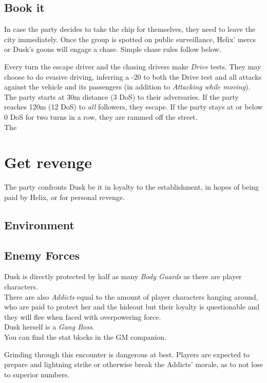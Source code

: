 \subsection{Book it}
\label{sec:flee}
In case the party decides to take the chip for themselves,
	they need to leave the city immediately.
Once the group is spotted on public surveillance,
	Helix' mercs or Dusk's goons
	will engage a chase.
Simple chase rules follow below.
\par
Every turn
	the escape driver and the chasing drivers
	make \emph{Drive} tests.
They may choose to do evasive driving,
	inferring a -20 to both the Drive test
	and all attacks against the vehicle and its passengers
	(in addition to \emph{Attacking while moving}).
\\%
The party starts at 30m distance (3 DoS) to their adversaries.
If the party reaches 120m (12 DoS) to \emph{all} followers,
	they escape.
If the party stays at or below 0 DoS for two turns in a row,
	they are rammed off the street.
\\%
The 

\section{Get revenge}
\label{sec:revenge}
The party confronts Dusk 
	be it
	in loyalty to the establishment,
	in hopes of being paid by Helix,
	or for personal revenge.
\subsection*{Environment}

\subsection*{Enemy Forces}
Dusk is directly protected by 
	half as many 
	\emph{Body Guards}
	as there are player characters.
	\\%
There are also
	\emph{Addicts}
	equal to the amount of player characters
	hanging around, who are paid to protect her and the hideout
	but their loyalty is questionable and they will flee when faced with overpowering force.
	\\%
Dusk herself is a \emph{Gang Boss}.
\\%
You can find the stat blocks in the GM companion.
\begin{exampleblock}
	Grinding through this encounter is dangerous at best.
	Players are expected to prepare
		and lightning strike
		or otherwise break the Addicts' morale,
		as to not lose to superior numbers.
\end{exampleblock}

